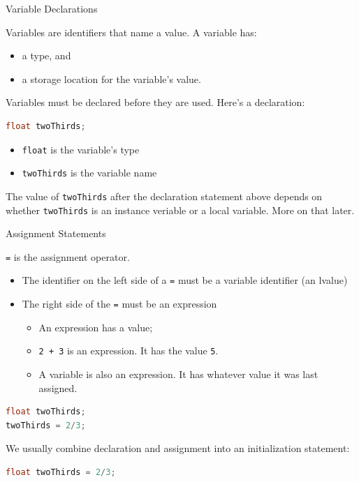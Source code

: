 \documentclass{beamer}
\begin{document}
\begin{frame}[fragile]{Variable Declarations}


Variables are identifiers that name a value. A variable has:
\begin{itemize}
\item a type, and
\item a storage location for the variable's value.
\end{itemize}

Variables must be declared before they are used.  Here's a declaration:
\begin{lstlisting}[language=Java]
float twoThirds;
\end{lstlisting}
\begin{itemize}
\item {\tt float} is the variable's type
\item {\tt twoThirds} is the variable name
\end{itemize}
The value of {\tt twoThirds} after the declaration statement above depends on whether {\tt twoThirds} is an instance veriable or a local variable.  More on that later.

\end{frame}

\begin{frame}[fragile]{Assignment Statements}


{\tt =} is the assignment operator.
\begin{itemize}
\item The identifier on the left side of a {\tt =} must be a variable identifier (an lvalue)
\item The right side of the {\tt =} must be an expression
\begin{itemize}
\item An expression has a value;
\item {\tt 2 + 3} is an expression.  It has the value {\tt 5}.
\item A variable is also an expression.  It has whatever value it was last assigned.
\end{itemize}

\end{itemize}

\begin{lstlisting}[language=Java]
float twoThirds;
twoThirds = 2/3;
\end{lstlisting}
We usually combine declaration and assignment into an initialization statement:
\begin{lstlisting}[language=Java]
float twoThirds = 2/3;
\end{lstlisting}


\end{frame}
\end{document}

